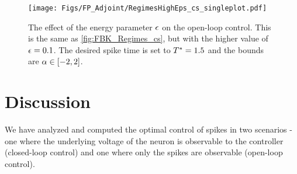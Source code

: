 \begin{figure}[htp]
\begin{center}
  \texttt{[image: Figs/FP\_Adjoint/RegimesHighEps\_cs\_singleplot.pdf]}
  \caption[Open-loop Optimal Control solution for higher energy penalty]{The
  effect of the energy parameter ${\epsilon}$ on the open-loop control. This is the same as \cref{fig:FBK_Regimes_cs}, but with the higher
  value of ${\epsilon} =0.1$. 
  The desired spike time is set to ${ T^* }=1.5$ and the bounds are $\alpha \in [-2,2]$.}
    \label{fig:FBK_Regimes_cs_different_es} 
\end{center}
\end{figure}

% 

\clearpage

\section{Discussion}
We have analyzed and computed the optimal control of spikes in two scenarios -
one where the underlying voltage of the neuron is observable to the controller
(closed-loop control) and one where only the spikes are observable (open-loop
control).

